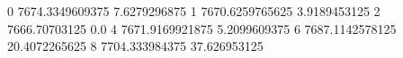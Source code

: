 0 7674.3349609375 7.6279296875
1 7670.6259765625 3.9189453125
2 7666.70703125 0.0
4 7671.9169921875 5.2099609375
6 7687.1142578125 20.4072265625
8 7704.333984375 37.626953125
